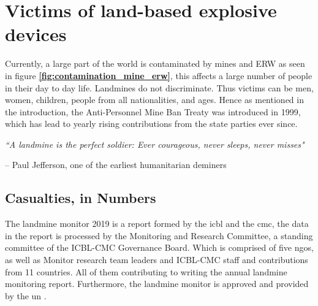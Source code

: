 \setlength{\parindent}{0pt}
\section{Victims of land-based explosive devices} \label{chap:Victims of land-based explosive devices}

Currently, a large part of the world is contaminated by mines and ERW as seen in figure \textbf{\ref{fig:contamination_mine_erw}}, this affects a large number of people in their day to day life. Landmines do not discriminate. Thus victims can be men, women, children, people from all nationalities, and ages. Hence as mentioned in the introduction, the Anti-Personnel Mine Ban Treaty was introduced in 1999, which has lead to yearly rising contributions from the state parties ever since. \cite{LandmineMonitor2019} 

        \vspace{5mm}

\begin{centering}

\textit{\large “A landmine is the perfect soldier: Ever courageous, never sleeps, never misses"}\\

\begin{flushright}

        \vspace{-3mm}
        
-- Paul Jefferson, one of the earliest humanitarian deminers \hspace{4mm}

\end{flushright}
\end{centering}


\subsection{Casualties, in Numbers}


The landmine monitor 2019 is a report formed by the \gls{icbl} and the \gls{cmc}, the data in the report is processed by the Monitoring and Research Committee, a standing committee of the ICBL-CMC Governance Board. Which is comprised of five \gls{ngo}s, as well as Monitor research team leaders and ICBL-CMC staff and contributions from 11 countries. All of them contributing to writing the annual landmine monitoring report. Furthermore, the landmine monitor is approved and provided by the \gls{un} \cite{LandmineMonitor2019}.

